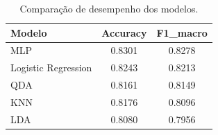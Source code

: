 \begin{table}[ht]
\centering
\caption{Comparação de desempenho dos modelos.}
\label{tab:desempenho_modelos}
\begin{tabular}{l c c}
\toprule
Modelo & Accuracy & F1\_macro \\
\midrule
MLP & 0.8301 & 0.8278 \\
Logistic Regression & 0.8243 & 0.8213 \\
QDA & 0.8161 & 0.8149 \\
KNN & 0.8176 & 0.8096 \\
LDA & 0.8080 & 0.7956 \\
\bottomrule
\end{tabular}
\end{table}
